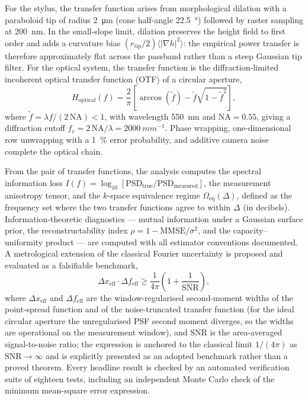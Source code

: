\documentclass{imeko_wc}
\begin{document}
For the stylus, the transfer function arises from morphological dilation with a paraboloid tip of radius \qty{2}{\micro\metre} (cone half-angle \qty{22.5}{\degree}) followed by raster sampling at \qty{200}{\nano\metre}. In the small-slope limit, dilation preserves the height field to first order and adds a curvature bias $(r_\mathrm{tip}/2)\langle|\nabla h|^2\rangle$: the empirical power transfer is therefore approximately flat across the passband rather than a steep Gaussian tip filter. For the optical system, the transfer function is the diffraction-limited incoherent optical transfer function (OTF) of a circular aperture,
\begin{equation}
H_\mathrm{optical}(f) = \frac{2}{\pi}\!\left[\arccos(\tilde{f}) - \tilde{f}\sqrt{1-\tilde{f}^2}\right],
\end{equation}
where $\tilde{f} = \lambda f/(2\,\mathrm{NA}) < 1$, with wavelength \qty{550}{\nano\metre} and $\mathrm{NA} = 0.55$, giving a diffraction cutoff $f_c = 2\,\mathrm{NA}/\lambda = \qty{2000}{mm^{-1}}$. Phase wrapping, one-dimensional row unwrapping with a \qty{1}{\percent} error probability, and additive camera noise complete the optical chain.

From the pair of transfer functions, the analysis computes the spectral information loss $I(f) = \log_{10}[\mathrm{PSD}_\mathrm{true}/\mathrm{PSD}_\mathrm{measured}]$, the measurement anisotropy tensor, and the $k$-space equivalence regime $\Omega_\mathrm{eq}(\Delta)$, defined as the frequency set where the two transfer functions agree to within $\Delta$ (in decibels). Information-theoretic diagnostics --- mutual information under a Gaussian surface prior, the reconstructability index $\rho = 1 - \mathrm{MMSE}/\sigma^2$, and the capacity--uniformity product --- are computed with all estimator conventions documented. A metrological extension of the classical Fourier uncertainty is proposed and evaluated as a falsifiable benchmark,
\begin{equation}
\Delta x_\mathrm{eff}\cdot\Delta f_\mathrm{eff} \geq \frac{1}{4\pi}\left(1 + \frac{1}{\overline{\mathrm{SNR}}}\right),
\end{equation}
where $\Delta x_\mathrm{eff}$ and $\Delta f_\mathrm{eff}$ are the window-regularised second-moment widths of the point-spread function and of the noise-truncated transfer function (for the ideal circular aperture the unregularised PSF second moment diverges, so the widths are operational on the measurement window), and $\overline{\mathrm{SNR}}$ is the area-averaged signal-to-noise ratio; the expression is anchored to the classical limit $1/(4\pi)$ as $\overline{\mathrm{SNR}}\to\infty$ and is explicitly presented as an adopted benchmark rather than a proved theorem. Every headline result is checked by an automated verification suite of eighteen tests, including an independent Monte Carlo check of the minimum mean-square error expression.
\end{document}
